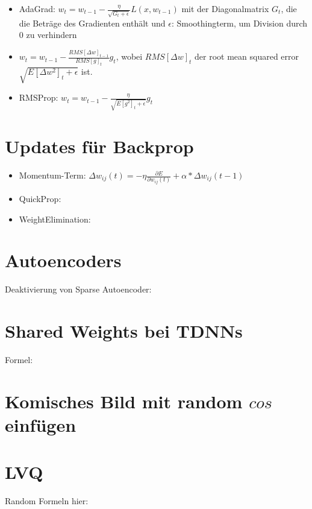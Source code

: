 \documentclass[paper=a4, fontsize=11pt]{scrartcl} %
\begin{document}
\begin{itemize}
\item AdaGrad: $w_t = w_{t-1} - \frac{\eta}{\sqrt{G_t+\epsilon}} L(x,w_{t-1})$ mit der Diagonalmatrix $G_t$, die die Beträge des Gradienten enthält und $\epsilon$: Smoothingterm, um Division durch 0 zu verhindern
\item $w_t = w_{t-1} - \frac{RMS[\Delta w]_{t-1}}{RMS[g]_t}g_t$, wobei $RMS[\Delta w]_t$ der \glqq root mean squared error\grqq\ $\sqrt{E[\Delta w^2]_t + \epsilon}$ ist.
\item RMSProp: $w_t = w_{t-1} - \frac{\eta}{\sqrt{E[g^2]_t + \epsilon}} g_t$
\end{itemize}

\section{Updates für Backprop}

\begin{itemize}
\item Momentum-Term: $\Delta w_{ij}(t) = - \eta \frac{\partial E}{\partial w_{ij}(t)} + \alpha * \Delta w_{ij}(t-1)$
\item QuickProp: 
\item WeightElimination: 
\end{itemize}

\section{Autoencoders}

Deaktivierung von Sparse Autoencoder: 

\section{Shared Weights bei TDNNs}

Formel: 

\section{Komisches Bild mit random $cos$ einfügen}

\section{LVQ}

Random Formeln hier:
\end{document}
